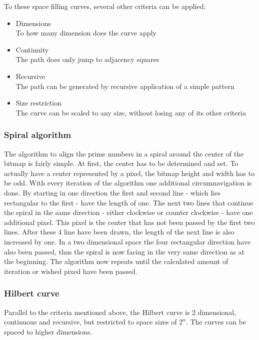 \medskip
To these space filling curves, several other criteria can be applied:
\begin{itemize}%
   \item Dimensions\\
      To how many dimension does the curve apply
   \item Continuity\\
      The path does only jump to adjacency squares
   \item Recursive\\
      The path can be generated by recursive application of a simple pattern
   \item Size restriction\\
      The curve can be scaled to any size, without losing any of its other criteria
\end{itemize}%

\subsubsection{Spiral algorithm}
The algorithm to align the prime numbers in a spiral around the center of the bitmap is fairly simple. At first, the center has to be determined and set. To actually have a center represented by a pixel, the bitmap height and width has to be odd. With every iteration of the algorithm one additional circumnavigation is done. By starting in one direction the first and second line - which lies rectangular to the first - have the length of one. The next two lines that continue the spiral in the same direction - either clockwise or counter clockwise - have one additional pixel. This pixel is the center that has not been passed by the first two lines. After these 4 line have been drawn, the length of the next line is also increased by one. In a two dimensional space the four rectangular direction have also been passed, thus the spiral is now facing in the very same direction as at the beginning. The algorithm now repeats until the calculated amount of iteration or wished pixed have been passed.

\subsubsection{Hilbert curve}
Parallel to the criteria mentioned above, the Hilbert curve is 2 dimensional, continuous and recursive, but restricted to space sizes of $2^{n}$. The curves can be spaced to higher dimensions.

